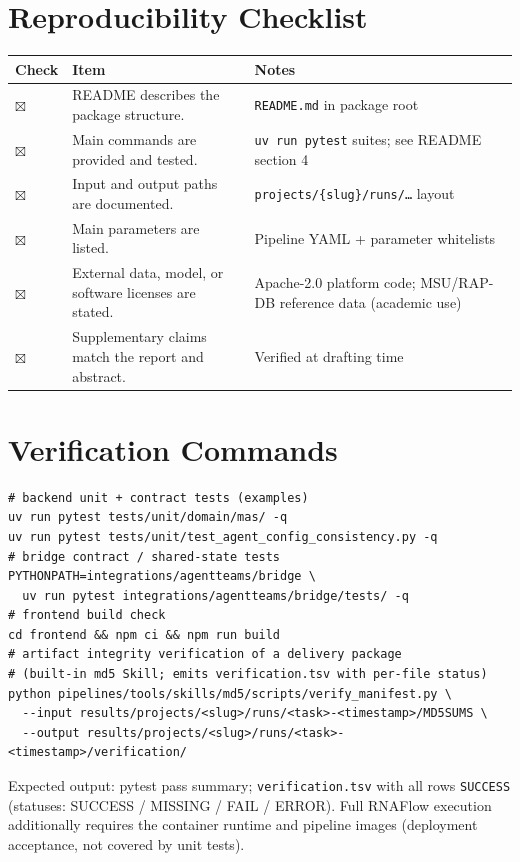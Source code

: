 \documentclass[11pt,a4paper]{article}
\begin{document}
\section{Reproducibility Checklist}
\begin{tabularx}{\textwidth}{p{}X X}
\toprule
\textbf{Check} & \textbf{Item} & \textbf{Notes}\\
\midrule
$\boxtimes$ & README describes the package structure. & \texttt{README.md} in package root\\
$\boxtimes$ & Main commands are provided and tested. & \texttt{uv run pytest} suites; see README section 4\\
$\boxtimes$ & Input and output paths are documented. & \texttt{projects/\{slug\}/runs/\dots} layout\\
$\boxtimes$ & Main parameters are listed. & Pipeline YAML + parameter whitelists\\
$\boxtimes$ & External data, model, or software licenses are stated. & Apache-2.0 platform code; MSU/RAP-DB reference data (academic use)\\
$\boxtimes$ & Supplementary claims match the report and abstract. & Verified at drafting time\\
\bottomrule
\end{tabularx}

\section{Verification Commands}

\begin{verbatim}
# backend unit + contract tests (examples)
uv run pytest tests/unit/domain/mas/ -q
uv run pytest tests/unit/test_agent_config_consistency.py -q
# bridge contract / shared-state tests
PYTHONPATH=integrations/agentteams/bridge \
  uv run pytest integrations/agentteams/bridge/tests/ -q
# frontend build check
cd frontend && npm ci && npm run build
# artifact integrity verification of a delivery package
# (built-in md5 Skill; emits verification.tsv with per-file status)
python pipelines/tools/skills/md5/scripts/verify_manifest.py \
  --input results/projects/<slug>/runs/<task>-<timestamp>/MD5SUMS \
  --output results/projects/<slug>/runs/<task>-<timestamp>/verification/
\end{verbatim}

Expected output: pytest pass summary; \texttt{verification.tsv} with all rows \texttt{SUCCESS} (statuses: SUCCESS / MISSING / FAIL / ERROR). Full RNAFlow execution additionally requires the container runtime and pipeline images (deployment acceptance, not covered by unit tests).
\end{document}
